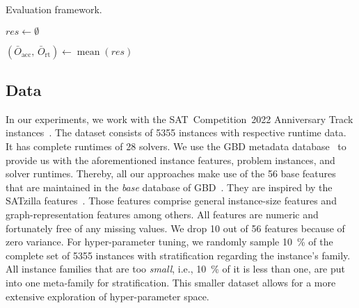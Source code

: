 \documentclass[runningheads]{llncs}
\begin{document}
\vspace{-0.2cm}
\begin{algorithm}[htbp]
  \caption{Evaluation framework.}
  \label{alg:eval}


  $res \leftarrow \emptyset$


  $\left( \bar{O}_{\operatorname{acc}},\, \bar{O}_{\operatorname{rt}} \right) \leftarrow \operatorname{mean}\!\left( res \right)$

\end{algorithm}
\vspace{-0.2cm}

\subsection{Data}
In our experiments, we work with the SAT~Competition~2022 Anniversary Track instances~\cite{sat2022}.
The dataset consists of 5355 instances with respective runtime data.
It has complete runtimes of 28 solvers.
We use the GBD metadata database~\cite{IserS18} to provide us with the aforementioned instance features, problem instances, and solver runtimes.
Thereby, all our approaches make use of the 56 base features that are maintained in the \textit{base} database of GBD~\cite{IserS18}.
They are inspired by the SATzilla features~\cite{features}.
Those features comprise general instance-size features and graph-representation features among others.
All features are numeric and fortunately free of any missing values.
We drop 10 out of 56 features because of zero variance.
For hyper-parameter tuning, we randomly sample \SI{10}{\%} of the complete set of 5355 instances with stratification regarding the instance's family.
All instance families that are too \textit{small}, i.e., \SI{10}{\%} of it is less than one, are put into one meta-family for stratification.
This smaller dataset allows for a more extensive exploration of hyper-parameter space.
\end{document}

